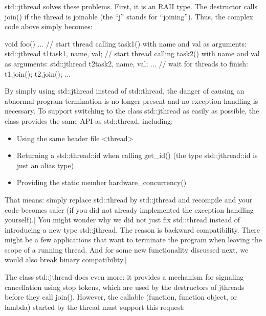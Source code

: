 std::jthread solves these problems. First, it is an RAII type. The destructor calls join() if the thread is joinable (the “j” stands for “joining”). Thus, the complex code above simply becomes:

\begin{cpp}
void foo()
{
	...
	// start thread calling task1() with name and val as arguments:
	std::jthread t1{task1, name, val};
	// start thread calling task2() with name and val as arguments:
	std::jthread t2{task2, name, val};
	...
	// wait for threads to finish:
	t1.join();
	t2.join();
	...
}
\end{cpp}

By simply using std::jthread instead of std::thread, the danger of causing an abnormal program termination is no longer present and no exception handling is necessary. To support switching to the class std::jthread as easily as possible, the class provides the same API as std::thread, including:

\begin{itemize}
\item 
Using the same header file <thread>

\item 
Returning a std::thread::id when calling get\_id() (the type std::jthread::id is just an alias type)

\item 
Providing the static member hardware\_concurrency()
\end{itemize}

That means: simply replace std::thread by std::jthread and recompile and your code becomes safer (if you did not already implemented the exception handling yourself).[ You might wonder why we did not just fix std::thread instead of introducing a new type std::jthread. The reason is backward compatibility. There might be a few applications that want to terminate the program when leaving the scope of a running thread. And for some new functionality discussed next, we would also break binary compatibility.]


The class std::jthread does even more: it provides a mechanism for signaling cancellation using stop tokens, which are used by the destructors of jthreads before they call join(). However, the callable (function, function object, or lambda) started by the thread must support this request:

